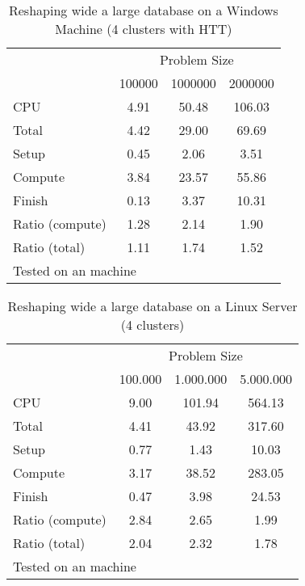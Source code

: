 \documentclass[letterpaper, 10pt]{article}
\begin{document}
\begin{table}[!h]
\centering
\caption{Reshaping wide a large database on a Windows Machine (4 clusters with HTT)}
\begin{tabular}{l*{3}{c}}\hline
& \multicolumn{3}{c}{Problem Size} \\
& 100000 &         1000000 &         2000000 \\ \hline
CPU &     4.91 &     50.48 &    106.03 \\
Total &     4.42 &     29.00 &     69.69 \\
\hspace{2mm} Setup &     0.45 &      2.06 &      3.51 \\
\hspace{2mm} Compute &     3.84 &     23.57 &     55.86 \\
\hspace{2mm} Finish &     0.13 &      3.37 &     10.31 \\
\hline Ratio (compute) &     1.28 &      2.14 &      1.90 \\
Ratio (total) &     1.11 &      1.74 &      1.52 \\
\hline
\multicolumn{4}{l}{\footnotesize Tested on an \win1 machine}
\end{tabular}
\end{table}

\begin{table}[!h]
\centering
\caption{Reshaping wide a large database on a Linux Server (4 clusters)}
\begin{tabular}{l*{3}{c}}\hline
& \multicolumn{3}{c}{Problem Size} \\
& 100.000 &          1.000.000 &         5.000.000 \\ \hline
CPU &     9.00 &    101.94 &    564.13 \\
Total &     4.41 &     43.92 &    317.60 \\
\hspace{2mm} Setup &     0.77 &      1.43 &     10.03 \\
\hspace{2mm} Compute &     3.17 &     38.52 &    283.05 \\
\hspace{2mm} Finish &     0.47 &      3.98 &     24.53 \\
\hline Ratio (compute) &     2.84 &      2.65 &      1.99 \\
Ratio (total) &     2.04 &      2.32 &      1.78 \\
\hline
\multicolumn{4}{l}{\footnotesize Tested on an \unix1 machine}
\end{tabular}
\end{table}
\end{document}
